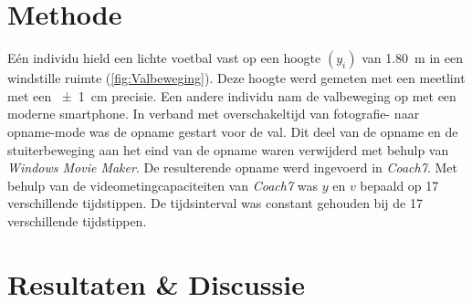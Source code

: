 \documentclass[•]{scrartcl}
\begin{document}
\section{Methode}
E\'{e}n individu hield een lichte voetbal vast op een hoogte $(y_i)$ van \SI{1.80}{\meter} in een windstille ruimte (\cref{fig:Valbeweging}). Deze hoogte werd gemeten met een meetlint met een \SI{+-1}{\centi\meter} precisie. Een andere individu nam de valbeweging op met een moderne smartphone. In verband met overschakeltijd van fotografie- naar opname-mode was de opname gestart voor de val. Dit deel van de opname en de stuiterbeweging aan het eind van de opname waren verwijderd met behulp van \textit{Windows Movie Maker}. De resulterende opname werd ingevoerd in \textit{Coach7}. Met behulp van de videometingcapaciteiten van \textit{Coach7} was $y$ en $v$ bepaald op \num{17} verschillende tijdstippen. De tijdsinterval was constant gehouden bij de \num{17} verschillende tijdstippen. 

%
\newpage
\section{Resultaten \& Discussie}
\end{document}
